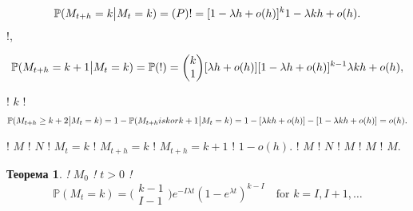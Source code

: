 \documentclass[12pt,fleqn]{article}
\newtheorem{theorem}{Теорема}[section]
\numberwithin{figure}{section}
\numberwithin{equation}{section}
\begin{document}
\begin{equation}
\mathbb{P}(M_{t+h}=k\big| M_t=k) = \mathbb(P)\text{!}
\\=[1-\lambda h + o(h)]^k
\\1 - \lambda k h + o(h).
\end{equation}
!,

\begin{equation}
\mathbb{P}(M_{t+h}=k+1 \big | M_t = k) = \mathbb{P}(\text{!})\\
=\bigg(\begin{matrix} k \\ 1 \end{matrix}\bigg)[\lambda h + o(h)][1-\lambda h + o(h)]^{k-1}\\
\lambda k h + o(h),
\end{equation}

! $k$ !
\begin{equation}
\mathbb{P}(M_{t+h}\geq k + 2 \big| M_t = k) = 1 - \mathbb{P}(M_{t+h} is k or k+1 \big| M_t=k)
\\= 1- [\lambda kh + o(h)] - [1-\lambda kh + o(h)]
\\= o(h).
\end{equation}

! $M$ ! $N$ ! $M_t = k$ ! $M_{t+h} = k$ ! $M_{t+h} = k+1$ ! $1-o(h)$. ! $M$ ! $N$ ! $M$ ! $M$ ! $M$.

\begin{theorem}
  ! $M_0$ ! $t>0$ !
  \begin{equation}\label{11.37}
    \mathbb{P}(M_t=k) = \bigg(\begin{matrix}
                          k-1 \\
                          I-1
                        \end{matrix}\bigg) e^{-I\lambda t}(1-e^{\lambda t})^{k-I}\quad \text{for $k=I, I+1, \dots$}
  \end{equation}
\end{theorem}
\end{document}

